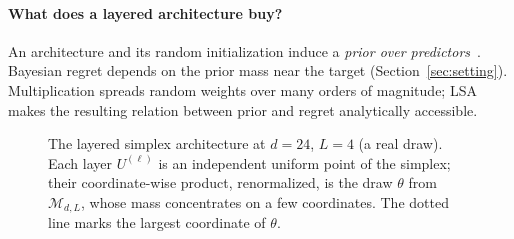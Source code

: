 \documentclass[anon]{alt2027}
\newcommand{\LSA}{\mathcal{M}_{d,L}}
\begin{document}
\paragraph{What does a layered architecture buy?}
An architecture and its random initialization induce a \emph{prior over predictors}~\citep{MerhavFeder1998,feder2025framework}. Bayesian regret depends on the prior mass near the target (Section~\ref{sec:setting}). Multiplication spreads random weights over many orders of magnitude; LSA makes the resulting relation between prior and regret analytically accessible.

\begin{figure}[!t]
\centering
\resizebox{\columnwidth}{!}{}
\caption{The layered simplex architecture at $d=24$, $L=4$ (a real draw). Each layer $U^{(\ell)}$ is an independent uniform point of the simplex; their coordinate-wise product, renormalized, is the draw $\theta$ from $\LSA$, whose mass concentrates on a few coordinates. The dotted line marks the largest coordinate of $\theta$.}
\label{fig:lsa}
\end{figure}
\end{document}
